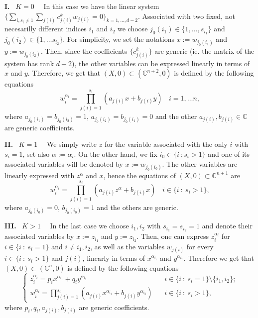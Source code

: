 \documentclass[oneside]{amsart}
\numberwithin{equation}{section}
\numberwithin{equation}{subsection}
\theoremstyle{plain}
\theoremstyle{definition}
\def\C{\mathbb C}
\newcommand{\al}{\alpha}
\begin{document}
{\bf I.} \ $K=0$ \ \  In this case we have the linear system $\{\sum_{i,s_i\neq 1}\sum_{j(i)}c^k_{j(i)} w_{j(i)}=0\}_{k=1,\dots,d-2}$. Associated with two fixed, not necesarilly different indices $i_1$ and $i_2$ we choose $j_0(i_1)\in\{1,\dots,s_{i_1}\}$ and $j_0(i_2)\in \{1,\dots s_{i_2}\}$. For simplicity, we set the notations $x:=w_{j_0(i_1)}$ and $y:=w_{j_0(i_2)}$. Then, since the coefficients $\{c^k_{j(i)}\}$ are generic (ie. the matrix of the system has rank $d-2$), the other variables can be expressed linearly in terms of $x$ and $y$. Therefore, we get that $(X,0)\subset (\C^{n+2},0)$ is defined by the following equations
\begin{equation}
w_i^{\al_i}=\prod_{j(i)=1}^{s_i} (a_{j(i)}x + b_{j(i)} y )  \  \ \ \ i=1,\dots n,
\end{equation}
where $a_{j_0(i_1)}=b_{j_0(i_2)}=1$, $a_{j_0(i_2)}=b_{j_0(i_1)}=0$ and the other $a_{j(i)}, b_{j(i)}\in \C$ are generic coefficients.

{\bf II.} \ $K=1$ \ \ We simply write $z$ for the variable associated with the only $i$ with $s_i=1$, set also $\al:=\al_i$. On the other hand, we fix $i_0\in\{i \ : s_i>1\}$ and one of its associated variables will be denoted by $x:=w_{j_0(i_0)}$. The other variables are linearly expressed with $z^\al$ and $x$, hence the equations of $(X,0)\subset \C^{n+1}$ are
\begin{equation}
w_i^{\al_i}=\prod_{j(i)=1}^{s_i} (a_{j(i)}z^{\al} + b_{j(i)} x )  \  \ \ \ i\in\{i \ : \ s_i>1\},
\end{equation}
where $a_{j_0(i_0)}=0$, $b_{j_0(i_0)}=1$ and the others are generic.

{\bf III.} \ $K>1$ \ \ In the last case we choose $i_1,i_2$ with $s_{i_1}=s_{i_2}=1$ and denote their associated variables by $x:=z_{i_1}$ and $y:=z_{i_2}$. Then, one can express  $z_i^{\al_i}$ for $i\in \{i \ : \ s_i=1\}$ and $i\neq i_1,i_2$, as well as the variables $w_{j(i)}$ for every $i\in \{i \ : \ s_i>1\}$ and $j(i)$, linearly in terms of $x^{\al_{i_1}}$ and $y^{\al_{i_2}}$. Therefore we get that $(X,0)\subset (\C^n,0)$ is defined by the following equations
\begin{equation}
\begin{cases}
z_i^{\al_i}=p_ix^{\al_{i_1}}+q_i y^{\al_{i_2}} \ \ \ \ & i\in\{i \ : \ s_i=1\}\setminus \{i_1,i_2\};\\
w_i^{\al_i}=\prod_{j(i)=1}^{s_i} (a_{j(i)}x^{\al_{i_1}} + b_{j(i)} y^{\al_{i_2}} )  \  \ \ \ & i\in\{i \ : \ s_i>1\},
\end{cases}
\end{equation}
where $p_i,q_i, a_{j(i)}, b_{j(i)}$ are generic coefficients.
\end{document}
